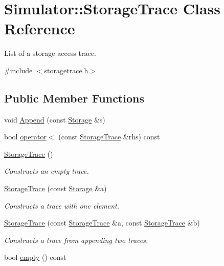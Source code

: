 \hypertarget{class_simulator_1_1_storage_trace}{\section{Simulator\+:\+:Storage\+Trace Class Reference}
\label{class_simulator_1_1_storage_trace}
}


List of a storage access trace.  




{\ttfamily \#include $<$storagetrace.\+h$>$}

\subsection*{Public Member Functions}
\begin{DoxyCompactItemize}
\item 
void \hyperlink{class_simulator_1_1_storage_trace_a25e6635f9c84392a033ef762291f1e4a}{Append} (const \hyperlink{class_simulator_1_1_storage}{Storage} \&s)
\item 
bool \hyperlink{class_simulator_1_1_storage_trace_ad4437a9f39a0a55c6547857b6309e77b}{operator$<$} (const \hyperlink{class_simulator_1_1_storage_trace}{Storage\+Trace} \&rhs) const 
\item 
\hyperlink{class_simulator_1_1_storage_trace_a50f555055d016df1f29c66c2b6b7f22f}{Storage\+Trace} ()
\begin{DoxyCompactList}\small\item\em Constructs an empty trace. \end{DoxyCompactList}\item 
\hyperlink{class_simulator_1_1_storage_trace_a310334869257e884743dd21812962458}{Storage\+Trace} (const \hyperlink{class_simulator_1_1_storage}{Storage} \&a)
\begin{DoxyCompactList}\small\item\em Constructs a trace with one element. \end{DoxyCompactList}\item 
\hyperlink{class_simulator_1_1_storage_trace_ab59ee50a5eb5df4b5d310bf983e58958}{Storage\+Trace} (const \hyperlink{class_simulator_1_1_storage_trace}{Storage\+Trace} \&a, const \hyperlink{class_simulator_1_1_storage_trace}{Storage\+Trace} \&b)
\begin{DoxyCompactList}\small\item\em Constructs a trace from appending two traces. \end{DoxyCompactList}\item 
bool \hyperlink{class_simulator_1_1_storage_trace_a6b0385f4f11d285ba0ade7c7490268b3}{empty} () const 
\end{DoxyCompactItemize}
